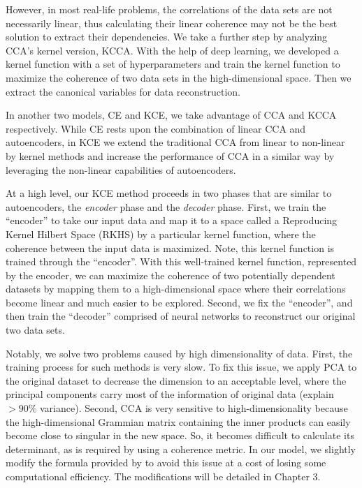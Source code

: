 \documentclass[12pt]{report} %
\begin{document}
However, in most real-life problems, the correlations of the data sets are not necessarily linear, thus calculating their linear coherence may not be the best solution to extract their dependencies. We take a further step by analyzing CCA's kernel version, KCCA. With the help of deep learning, we developed a kernel function with a set of hyperparameters and train the kernel function to maximize the coherence of two data sets in the high-dimensional space. Then we extract the canonical variables for data reconstruction.

In another two models, CE and KCE, we take advantage of CCA and KCCA respectively. While CE rests upon the combination of linear CCA and autoencoders, in KCE we extend the traditional CCA from linear to non-linear by kernel methods and increase the performance of CCA in a similar way by leveraging the non-linear capabilities of autoencoders.

At a high level, our KCE method proceeds in two phases that are similar to autoencoders, the \textit{encoder} phase and the \textit{decoder} phase. First, we train the ``encoder'' to take our input data and map it to a space called a Reproducing Kernel Hilbert Space (RKHS)\cite{RKHS} by a particular kernel function, where the coherence between the input data is maximized. Note, this kernel function is trained through the ``encoder''. With this well-trained kernel function, represented by the encoder, we can maximize the coherence of two potentially dependent datasets by mapping them to a high-dimensional space where their correlations become linear and much easier to be explored. Second, we fix the ``encoder'', and then train the ``decoder'' comprised of neural networks to reconstruct our original two data sets.

Notably, we solve two problems caused by high dimensionality of data. First, the training process for such methods is very slow. To fix this issue, we apply PCA to the original dataset to decrease the dimension to an acceptable level, where the principal components carry most of the information of original data (explain $>90\%$ variance). Second, CCA is very sensitive to high-dimensionality because the high-dimensional Grammian matrix\cite{GM} containing the inner products can easily become close to singular\cite{SM} in the new space. So, it becomes difficult to calculate its determinant, as is required by using a coherence metric. In our model, we slightly modify the formula provided by \cite{ECCA} to avoid this issue at a cost of losing some computational efficiency. The modifications will be detailed in Chapter 3.
\end{document}
